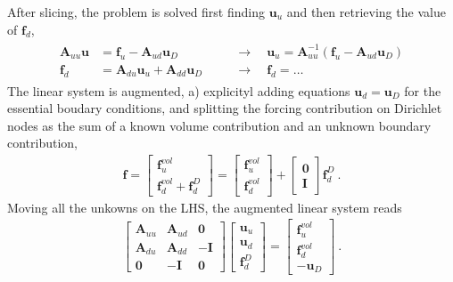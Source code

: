 \documentclass[letterpaper,10pt,english]{jupyterBook}
\begin{document}
\sphinxAtStartPar
After slicing, the problem is solved first finding \(\mathbf{u}_u\) and then retrieving the value of \(\mathbf{f}_d\),
\begin{equation*}
\begin{split}\begin{aligned}
  \mathbf{A}_{uu} \mathbf{u} & = \mathbf{f}_u - \mathbf{A}_{ud} \mathbf{u}_D \quad && \rightarrow \quad \mathbf{u}_u = \mathbf{A}_{uu}^{-1} \left( \mathbf{f}_u - \mathbf{A}_{ud} \mathbf{u}_D \right) \\
  \mathbf{f}_d & = \mathbf{A}_{du} \mathbf{u}_u + \mathbf{A}_{dd} \mathbf{u}_D \quad && \rightarrow \quad \mathbf{f}_d = \dots
\end{aligned}\end{split}
\end{equation*}
\sphinxAtStartPar
{} The linear system is augmented, a) explicityl adding equations \(\mathbf{u}_d = \mathbf{u}_D\) for the essential boudary conditions, and splitting the forcing contribution on Dirichlet nodes as the sum of a known volume contribution and an unknown boundary contribution,
\begin{equation*}
\begin{split}\mathbf{f} = \begin{bmatrix} \mathbf{f}_u^{vol} \\ \mathbf{f}_d^{vol} + \mathbf{f}_d^D \end{bmatrix} = \begin{bmatrix} \mathbf{f}^{vol}_u \\ \mathbf{f}^{vol}_d \end{bmatrix} + \begin{bmatrix} \mathbf{0} \\ \mathbf{I} \end{bmatrix} \mathbf{f}^D_d \ .\end{split}
\end{equation*}
\sphinxAtStartPar
Moving all the unkowns on the LHS, the augmented linear system reads
\begin{equation*}
\begin{split}\begin{bmatrix} \mathbf{A}_{uu} & \mathbf{A}_{ud} & \mathbf{0} \\ \mathbf{A}_{du} & \mathbf{A}_{dd} & - \mathbf{I} \\ \mathbf{0} & -\mathbf{I} & \mathbf{0} \end{bmatrix} \begin{bmatrix} \mathbf{u}_u \\ \mathbf{u}_d \\ \mathbf{f}_d^D \end{bmatrix} = \begin{bmatrix} \mathbf{f}^{vol}_u \\ \mathbf{f}^{vol}_d \\ -\mathbf{u}_D \end{bmatrix} \ .\end{split}
\end{equation*}
\end{document}
